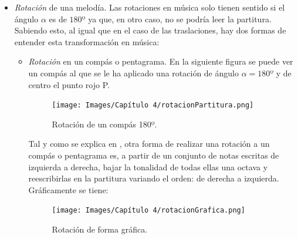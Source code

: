 \documentclass[a4paper, openright, 11pt, titlepage]{report}
\theoremstyle{definition}\newtheorem{defin}[propo]{Definition}
\theoremstyle{definition}\newtheorem{obser}[propo]{Remark}
\theoremstyle{definition}\newtheorem{ejem}[propo]{Ejemplo}
\theoremstyle{definition}\newtheorem{algoritmo}[propo]{Algoritmo}
\begin{document}
\begin{itemize}
\begin{enumerate}
    \end{enumerate}
    \item \textit{Rotación} de una melodía. Las rotaciones en música solo tienen sentido si el ángulo $\alpha$ es de $180º$ ya que, en otro caso, no se podría leer la partitura. Sabiendo esto, al igual que en el caso de las traslaciones, hay dos formas de entender esta transformación en música:
    \begin{itemize}
        \item \textit{Rotación} en un compás o pentagrama. En la siguiente figura se puede ver un compás al que se le ha aplicado una rotación de ángulo $\alpha = 180º$ y de centro el punto rojo P.
        \begin{figure}[H]
            \centering
            \texttt{[image: Images/Capítulo 4/rotacionPartitura.png]}
            \caption{Rotación de un compás 180º.}
        \end{figure}
        Tal y como se explica en \cite{didactica}, otra forma de realizar una rotación a un compás o pentagrama es, a partir de un conjunto de notas escritas de izquierda a derecha, bajar la tonalidad de todas ellas una octava y reescribirlas en la partitura variando el orden: de derecha a izquierda. Gráficamente se tiene:
        \begin{figure}[H]
            \centering
            \texttt{[image: Images/Capítulo 4/rotacionGrafica.png]}
            \caption{Rotación de forma gráfica. \cite{didactica}}
        \end{figure}
        

\end{itemize}
\end{itemize}
\end{document}
